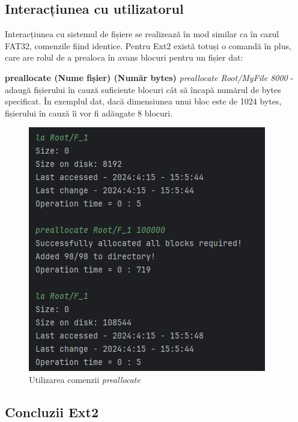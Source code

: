 \subsection{Interacțiunea cu utilizatorul}

Interacțiunea cu sistemul de fișiere se realizează în mod similar ca în cazul FAT32, comenzile fiind identice. Pentru Ext2 există totuși o comandă în plus, care are rolul de a prealoca în avans blocuri pentru un fișier dat:

\bigskip

\textbf{preallocate (Nume fișier) (Număr bytes)} \textit{preallocate Root/MyFile 8000} - adaugă fișierului în cauză suficiente blocuri cât să încapă numărul de bytes specificat. În exemplul dat, dacă dimensiunea unui bloc este de 1024 bytes, fișierului în cauză îi vor fi adăugate 8 blocuri.

\bigskip

\begin{figure}[h]
    \centering
    \includegraphics[width=0.7\linewidth]{images/2.8.png}
    \caption{Utilizarea comenzii \textit{preallocate}}
    \label{fig:enter-label}
\end{figure}

\subsection{Concluzii Ext2}

